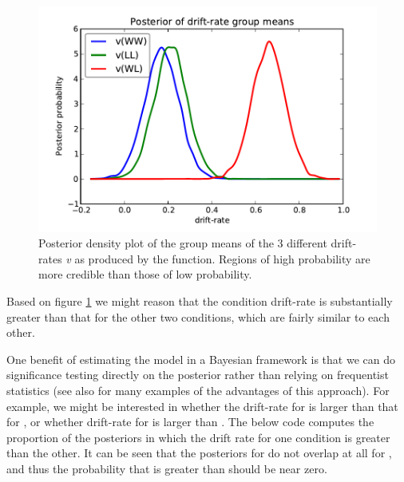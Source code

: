 \documentclass[letterpaper,10pt,english]{article}
\begin{document}
\begin{figure}
\includegraphics[scale=.7]{hddm_demo_fig_06.pdf}
\caption{Posterior density plot of the group means of the 3 different
drift-rates \emph{v} as produced by the
 function. Regions of high
probability are more credible than those of low probability.}
\label{fig.post_drift}
\end{figure}
Based on figure \ref{fig.post_drift} we might reason that the  condition drift-rate is substantially greater than that for the other two conditions, which are fairly similar to each other.

One benefit of estimating the model in a Bayesian framework is that we
can do significance testing directly on the posterior rather than
relying on frequentist statistics \citep{Lindley65} (see also
\citet{Kruschke10} for many examples of the advantages of this
approach). For example, we might be interested in whether the
drift-rate for  is larger than that for , or whether
drift-rate for  is larger than . The below code
computes the proportion of the posteriors in which the drift rate for
one condition is greater than the other. It can be seen that the
posteriors for  do not overlap at all for , and thus
the probability that  is greater than  should be
near zero.
\end{document}
